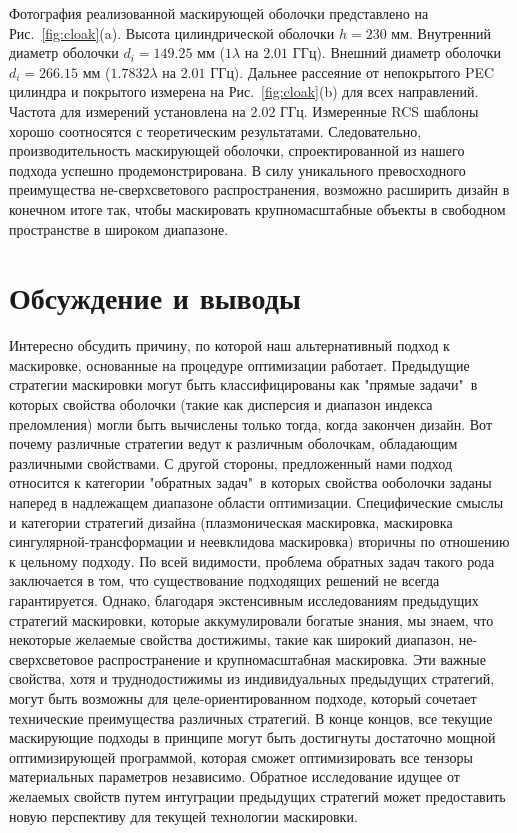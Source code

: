 \documentclass[a4paper, 12pt]{article}
\begin{document}
Фотография реализованной маскирующей оболочки представлено на 
Рис.~\ref{fig:cloak}(a). Высота цилиндрической оболочки $h=230$ мм. Внутренний
диаметр оболочки $d_i=149.25$ мм ($1\lambda$ на $2.01$ ГГц). Внешний
диаметр оболочки $d_i=266.15$ мм ($1.7832\lambda$ на $2.01$ ГГц). Дальнее
рассеяние от непокрытого PEC цилиндра и покрытого измерена на 
Рис.~\ref{fig:cloak}(b) для всех направлений. Частота для измерений установлена
на $2.02$ ГГц. Измеренные RCS шаблоны хорошо соотносятся с теоретическим 
результатами. Следовательно, производительность маскирующей оболочки,
спроектированной из нашего подхода успешно продемонстрирована. В силу
уникального превосходного преимущества не-сверхсветового распространения,
возможно расширить дизайн в конечном итоге так, чтобы маскировать
крупномасштабные объекты в свободном пространстве в широком диапазоне.

\section{Обсуждение и выводы}

Интересно обсудить причину, по которой наш альтернативный подход к маскировке,
основанные на процедуре оптимизации работает. Предыдущие стратегии маскировки
могут быть классифицированы как "прямые задачи"\, в которых свойства оболочки
(такие как дисперсия и диапазон индекса преломления) могли быть вычислены 
только тогда, когда закончен дизайн. Вот почему различные стратегии ведут
к различным оболочкам, обладающим различными свойствами. С другой стороны,
предложенный нами подход относится к категории "обратных задач"\,
в которых свойства ооболочки заданы наперед в надлежащем диапазоне
области оптимизации. Специфические смыслы и категории стратегий дизайна 
(плазмоническая маскировка, маскировка сингулярной-трансформации и неевклидова
маскировка) вторичны по отношению к цельному подходу. По всей видимости,
проблема обратных задач такого рода заключается в том, что существование
подходящих решений не всегда гарантируется. Однако, благодаря экстенсивным
исследованиям предыдущих стратегий маскировки, которые аккумулировали
богатые знания, мы знаем, что некоторые желаемые свойства достижимы,
такие как широкий диапазон, не-сверхсветовое распространение и крупномасштабная
маскировка. Эти важные свойства, хотя и труднодостижимы из индивидуальных 
предыдущих стратегий, могут быть возможны для целе-ориентированном подходе,
который сочетает технические преимущества различных стратегий. 
В конце концов, все текущие маскирующие подходы в принципе могут быть
достигнуты достаточно мощной оптимизирующей программой, которая сможет
оптимизировать все тензоры материальных параметров независимо. Обратное
исследование идущее от желаемых свойств путем интуграции предыдущих стратегий
может предоставить новую перспективу для текущей технологии маскировки.
\end{document}
